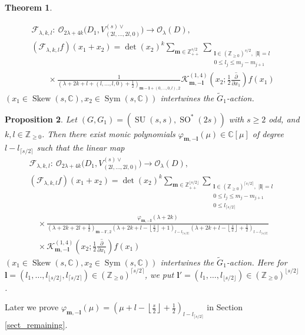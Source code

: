 \documentclass[pdftex]{sigma}
\numberwithin{equation}{section}
\newtheorem{Theorem}{Theorem}[section]
\newtheorem{Proposition}[Theorem]{Proposition}
{ \theoremstyle{definition}
\newtheorem{Definition}[Theorem]{Definition}
\newtheorem{Note}[Theorem]{Note}
\newtheorem{Example}[Theorem]{Example}
\newtheorem{Remark}[Theorem]{Remark} }
\newcommand{\bl}{\mathbf{l}}
\newcommand{\bm}{\mathbf{m}}
\newcommand{\BZ}{\mathbb{Z}}
\newcommand{\BC}{\mathbb{C}}
\newcommand{\cF}{\mathcal{F}}
\newcommand{\cK}{\mathcal{K}}
\newcommand{\cO}{\mathcal{O}}
\newcommand{\Sym}{\operatorname{Sym}}
\newcommand{\Skew}{\operatorname{Skew}}
\begin{document}
\begin{Theorem}
\begin{enumerate}
\begin{gather*}
\cF_{\lambda,k,l}\colon \ \cO_{2\lambda+4k}\big(D_1,V_{(2l,\dots,2l,0)}^{(s)\vee}\big)\to \cO_\lambda(D), \\
(\cF_{\lambda,k,l}f)(x_1+x_2)=\det(x_2)^k\sum_{\bm\in\BZ_{++}^{s/2}}
\sum_{\substack{\bl\in(\BZ_{\ge 0})^{s/2},\; |\bl|=l\\ 0\le l_j\le m_j-m_{j+1}}}\\
\qquad{} \times\frac{1}{\left(\lambda+2k+l+(l,\ldots,l,0)+\frac{1}{2}\right)_{\bm-\bl+(0,\ldots,0,l),2}}
\cK_{\bm,-\bl}^{(1,4)}\left(x_2;\frac{1}{2}\overline{\frac{\partial}{\partial x_1}}\right)f(x_1)
\end{gather*}
$(x_1\in\Skew(s,\BC), x_2\in\Sym(s,\BC))$ intertwines the $\tilde{G}_1$-action.
\end{enumerate}
\end{Theorem}
\begin{Proposition}\label{main_prop}Let $(G,G_1)=(\operatorname{SU}(s,s), \operatorname{SO}^*(2s))$ with $s\ge 2$ odd, and $k,l\in\BZ_{\ge 0}$. Then there exist monic polynomials $\varphi_{\bm,-\bl}(\mu)\in\BC[\mu]$ of degree $l-l_{\lceil s/2\rceil}$ such that the linear map
\begin{gather*}
\cF_{\lambda,k,l}\colon \ \cO_{2\lambda+4k}\big(D_1,V_{(2l,\dots,2l,0)}^{(s)\vee}\big)\to \cO_\lambda(D), \\
(\cF_{\lambda,k,l}f)(x_1+x_2)=\det(x_2)^k\sum_{\bm\in\BZ_{++}^{\lfloor s/2\rfloor}}
\sum_{\substack{\bl\in(\BZ_{\ge 0})^{\lceil s/2\rceil},\; |\bl|=l\\ 0\le l_j\le m_j-m_{j+1}\\ 0\le l_{\lceil s/2\rceil}}}\\
\quad {} \times\frac{\varphi_{\bm,-\bl}(\lambda+2k)}{\left(\lambda+2k+2l+\frac{1}{2}\right)_{\bm-\bl',2}
\left(\lambda+2k+l-\left\lfloor\frac{s}{2}\right\rfloor+1\right)_{l-l_{\lceil s/2\rceil}}
\left(\lambda+2k+l-\left\lfloor\frac{s}{2}\right\rfloor+\frac{1}{2}\right)_{l-l_{\lceil s/2\rceil}}} \\
\quad{}\times\cK_{\bm,-\bl}^{(1,4)}\left(x_2;\frac{1}{2}\overline{\frac{\partial}{\partial x_1}}\right)f(x_1)
\end{gather*}
$(x_1\in\Skew(s,\BC), x_2\in\Sym(s,\BC))$ intertwines the $\tilde{G}_1$-action.
Here for $\bl=(l_1,\ldots,l_{\lfloor s/2\rfloor},\allowbreak l_{\lceil s/2\rceil})\in(\BZ_{\ge 0})^{\lceil s/2\rceil}$, we put
$\bl'=(l_1,\ldots,l_{\lfloor s/2\rfloor})\in(\BZ_{\ge 0})^{\lfloor s/2\rfloor}$.
\end{Proposition}
Later we prove $\varphi_{\bm,-\bl}(\mu)=\left(\mu+l-\left\lfloor\frac{s}{2}\right\rfloor+\frac{1}{2}\right)_{l-l_{\lceil s/2\rceil}}$
in Section \ref{sect_remaining}.
\end{document}
